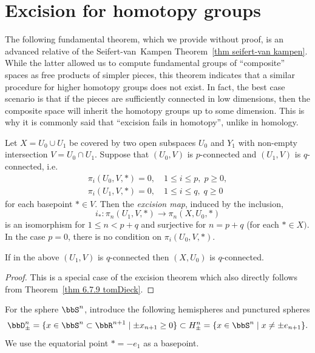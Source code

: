 \section{Excision for homotopy groups}

The following fundamental theorem, which we provide without proof, is an advanced relative of the Seifert-van~Kampen Theorem~\ref{thm seifert-van kampen}. While the latter allowed us to compute fundamental groups of ``composite'' spaces as free products of simpler pieces, this theorem indicates that a similar procedure for higher homotopy groups does not exist. In fact, the best case scenario is that if the pieces are sufficiently connected in low dimensions, then the composite space will inherit the homotopy groups up to some dimension. This is why it is commonly said that ``excision fails in homotopy'', unlike in homology.

\begin{thm}
    Let $X=U_0\cup U_1$ be covered by two open subspaces $U_0$ and $Y_1$ with non-empty intersection $V=U_0\cap U_1$. Suppose that $(U_0,V)$ is $p$-connected and $(U_1,V)$ is $q$-connected, i.e.
    \[
    \begin{matrix}
        \pi_i(U_0,V,*)=0,\quad 1\leq i\leq p,\; p\geq 0,\\
        \pi_i(U_1,V,*)=0,\quad 1\leq i\leq q,\; q\geq 0
    \end{matrix}
    \]
    for each basepoint $*\in V$. Then the \emph{excision map}, induced by the inclusion,
    \[i_\ast : \pi_n(U_1,V,*)\to \pi_n(X,U_0,*)\]
    is an isomorphism for $1\leq n <p+q$ and surjective for $n=p+q$ (for each $*\in X)$. In the case $p=0$, there is no condition on $\pi_i(U_0,V,*)$.
\end{thm}

\begin{cor}\label{prop 6.4.2 tomDieck}
    If in the above $(U_1,V)$ is $q$-connected then $(X,U_0)$ is $q$-connected.
\end{cor}
\begin{proof}
    This is a special case of the excision theorem which also directly follows from Theorem~\ref{thm 6.7.9 tomDieck}.
\end{proof}

For the sphere $\bbS^n$, introduce the following hemispheres and punctured spheres
\[\bbD^n_\pm=\{x\in \bbS^n\subset \bbR^{n+1}\mid \pm x_{n+1}\geq 0\}\subset H^n_\pm=\{x\in \bbS^n\mid x\neq \pm e_{n+1}\}.\]
We use the equatorial point $*=-e_1$ as a basepoint.


